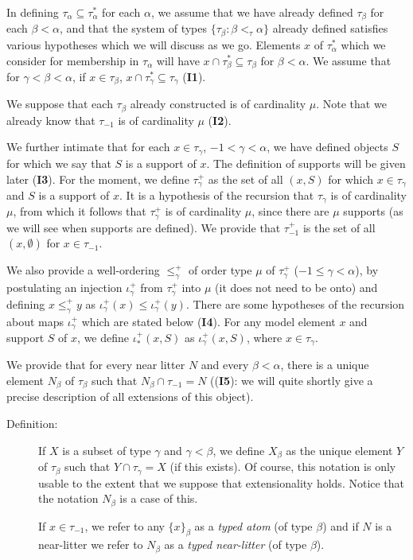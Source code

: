 \documentclass[112pt]{article}
\begin{document}
In defining $\tau_\alpha \subseteq \tau^*_\alpha$ for each $\alpha$, we assume that we have already defined $\tau_\beta$ for each $\beta<\alpha$, and that the system of types $\{\tau_\beta:\beta <_\tau \alpha\}$ already defined satisfies various hypotheses which we will discuss as we go.
Elements $x$ of $\tau^*_\alpha$ which we consider for membership in $\tau_\alpha$ will have $x \cap \tau^*_\beta \subseteq \tau_\beta$ for $\beta<\alpha$.  We assume that for $\gamma<\beta<\alpha$, if $x \in \tau_\beta$, $x \cap \tau^*_\gamma \subseteq \tau_\gamma$ ({\bf  I1}).

We suppose that each $\tau_\beta$ already constructed is of cardinality $\mu$.  Note that we already know that
$\tau_{-1}$ is of cardinality $\mu$ ({\bf I2}).


We further intimate that for each $x \in \tau_\gamma$, $-1<\gamma<\alpha$, we have defined objects $S$ for which we say that $S$ is a support of $x$.  The definition of supports will be given later ({\bf I3}).  For the moment, we define $\tau_\gamma^+$ as the set of all $(x,S)$ for which $x \in \tau_\gamma$ and $S$ is a support of $x$.  It is a hypothesis of the recursion
that $\tau_\gamma$ is of cardinality $\mu$, from which it follows that  $\tau^+_\gamma$ is of cardinality $\mu$, since there are $\mu$ supports (as we will see when supports are defined). We provide that $\tau_{-1}^+$ is the set
of all $(x,\emptyset)$ for $x \in \tau_{-1}$.  

We also provide a well-ordering $\leq^+_\gamma$ of order type $\mu$ of $\tau_\gamma^+$ ($-1 \leq \gamma <\alpha$), by postulating an injection $\iota^+_\gamma$ from $\tau_\gamma^+$ into $\mu$ (it does not need to be onto) and defining $x \leq^+_\gamma y$ as $\iota^+_\gamma(x) \leq \iota^+_\gamma(y)$.   There are some hypotheses of the recursion about maps $\iota^+_\gamma$ which are stated below ({\bf I4}).   For any model element $x$ and support $S$ of $x$, we define $\iota^+_*(x,S)$ as $\iota^+_\gamma(x,S)$, where $x \in \tau_\gamma$.


We provide that for every near litter $N$ and every $\beta<\alpha$, there is a unique element $N_\beta$ of $\tau_\beta$ such that $N_\beta \cap \tau_{-1}=N$ (({\bf I5}):  we will quite shortly give a precise description of all extensions of this object).

\begin{description}

\item[Definition:]  If $X$ is a subset of type $\gamma$ and $\gamma<\beta$, we define $X_\beta$ as the unique element $Y$ of $\tau_\beta$
such that $Y \cap \tau_\gamma = X$ (if this exists).  Of course, this notation is only usable to the extent that we suppose that extensionality holds.  Notice
that the notation $N_\beta$ is a case of this.

If $x \in \tau_{-1}$, we refer to any $\{x\}_\beta$ as a {\em typed atom\/} (of type $\beta$) and if $N$ is a near-litter we refer to $N_\beta$ as a {\em typed near-litter\/} (of type $\beta$).

\end{description}
\end{document}
